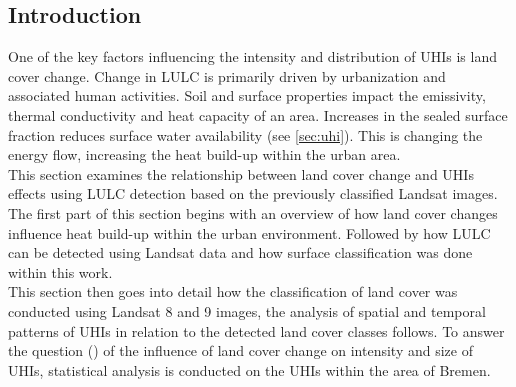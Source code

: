 \documentclass[12pt,a4paper, english,twoside]{scrartcl}
\begin{document}
    \subsection{Introduction}
      One of the key factors influencing the intensity and distribution of \glspl{UHI} is land cover change.
      Change in \gls{LULC} is primarily driven by urbanization and associated human activities.
      Soil and surface properties impact the emissivity, thermal conductivity and heat capacity of an area.
      Increases in the sealed surface fraction reduces surface water availability (see \cref{sec:uhi}).
      This is changing the energy flow, increasing the heat build-up within the urban area.
      \\    
      This section examines the relationship between land cover change and \glspl{UHI} effects using \gls{LULC} detection based on the previously classified Landsat images.
      The first part of this section begins with an overview of how land cover changes influence heat build-up within the urban environment. 
      Followed by how \gls{LULC} can be detected using Landsat data and how surface classification was done within this work. 
      \\
      This section then goes into detail how the classification of land cover was conducted using Landsat 8 and 9 images, the analysis of spatial and temporal patterns of \glspl{UHI} in relation to the detected land cover classes follows.
      To answer the question () of the influence of land cover change on intensity and size of \glspl{UHI}, statistical analysis is conducted on the \glspl{UHI} within the area of Bremen. \\
    \newpage
\end{document}
